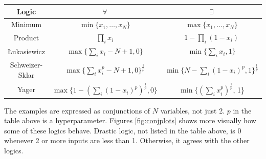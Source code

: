 \begin{center}
\begin{tabular}{ c | c c }
    Logic & $\forall$ & $\exists$ \\    
    \hline
    Minimum 
    & $\min\{ x_1, \dots, x_N \}$ 
    & $\max\{ x_1, \dots, x_N \}$ \\ 
    Product 
    & $\prod_ix_i$
    & $1 - \prod_{i}(1-x_i)$ \\
    Łukasiewicz
    & $\max\{\sum_ix_i - N + 1, 0\}$ 
    & $\min\{\sum_ix_i, 1\}$ \\
    Schweizer-Sklar
    & $\max\{\sum_ix^p_i - N + 1, 0\}^\frac{1}{p}$ 
    & $\min\{N-\sum_i(1-x_i)^p, 1\}^\frac{1}{p}$ \\
    Yager
    & $\max\{1 - (\sum_i(1-x_i)^p)^\frac{1}{p}, 0\}$ 
    & $\min\{(\sum_ix^p_i)^\frac{1}{p}$, 1\} \\
\end{tabular}
\end{center}
\vspace{5px}
The examples are expressed as conjunctions of $N$ variables, not just 2. $p$ in the table above is a hyperparameter. Figures \ref{fig:conjplots} shows more visually how some of these logics behave. Drastic logic, not listed in the table above, is $0$ whenever 2 or more inputs are less than 1. Otherwise, it agrees with the other logics.

